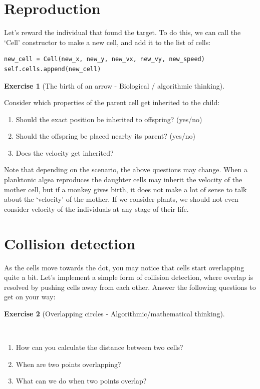 \documentclass[
  letterpaper,
  DIV=11,
  numbers=noendperiod]{scrreprt}
\providecommand{\tightlist}{%
  \setlength{\itemsep}{0pt}\setlength{\parskip}{0pt}}\usepackage{longtable,booktabs,array}
\theoremstyle{definition}
\newtheorem{exercise}{Exercise}[chapter]
\theoremstyle{remark}
\begin{document}
\section{Reproduction}\label{sec-reproduction}

Let's reward the individual that found the target. To do this, we can
call the `Cell' constructor to make a new cell, and add it to the list
of cells:

\begin{verbatim}
new_cell = Cell(new_x, new_y, new_vx, new_vy, new_speed)
self.cells.append(new_cell)
\end{verbatim}

\begin{exercise}[The birth of an arrow - Biological / algorithmic
thinking]\protect\hypertarget{exr-steering}{}\label{exr-steering}

Consider which properties of the parent cell get inherited to the child:

\begin{enumerate}
\def\labelenumi{\alph{enumi}.}
\tightlist
\item
  Should the exact position be inherited to offspring? (yes/no)
\item
  Should the offspring be placed nearby its parent? (yes/no)
\item
  Does the velocity get inherited?
\end{enumerate}

\end{exercise}

Note that depending on the scenario, the above questions may change.
When a planktonic algea reproduces the daughter cells may inherit the
velocity of the mother cell, but if a monkey gives birth, it does not
make a lot of sense to talk about the `velocity' of the mother. If we
consider plants, we should not even consider velocity of the individuals
at any stage of their life.

\section{Collision detection}\label{sec-collision}

As the cells move towards the dot, you may notice that cells start
overlapping quite a bit. Let's implement a simple form of collision
detection, where overlap is resolved by pushing cells away from each
other. Answer the following questions to get on your way:

\begin{exercise}[Overlapping circles - Algorithmic/mathematical
thinking]\protect\hypertarget{exr-steering}{}\label{exr-steering}

~

\begin{enumerate}
\def\labelenumi{\alph{enumi}.}
\tightlist
\item
  How can you calculate the distance between two cells?
\item
  When are two points overlapping?
\item
  What can we do when two points overlap?
\end{enumerate}

\end{exercise}
\end{document}
